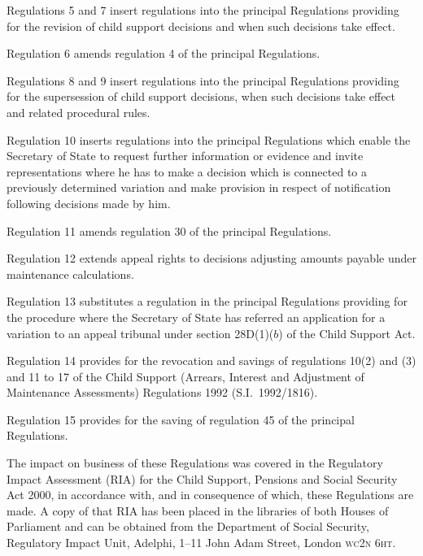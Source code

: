 \documentclass[12pt,a4paper]{article}
\begin{document}
Regulations 5 and 7 insert regulations into the principal Regulations providing for the revision of child support decisions and when such decisions take effect.

Regulation 6 amends regulation 4 of the principal Regulations.

Regulations 8 and 9 insert regulations into the principal Regulations providing for the supersession of child support decisions, when such decisions take effect and related procedural rules.

Regulation 10 inserts regulations into the principal Regulations which enable the Secretary of State to request further information or evidence and invite representations where he has to make a decision which is connected to a previously determined variation and make provision in respect of notification following decisions made by him.

Regulation 11 amends regulation 30 of the principal Regulations.

Regulation 12 extends appeal rights to decisions adjusting amounts payable under maintenance calculations.

Regulation 13 substitutes a regulation in the principal Regulations providing for the procedure where the Secretary of State has referred an application for a variation to an appeal tribunal under section 28D(1)($b$)  of the Child Support Act.

Regulation 14 provides for the revocation and savings of regulations 10(2) and (3) and 11 to 17 of the Child Support (Arrears, Interest and Adjustment of Maintenance Assessments) Regulations 1992 (S.I.\ 1992/1816).

Regulation 15 provides for the saving of regulation 45 of the principal Regulations.

The impact on business of these Regulations was covered in the Regulatory Impact Assessment (RIA) for the Child Support, Pensions and Social Security Act 2000, in accordance with, and in consequence of which, these Regulations are made. A copy of that RIA has been placed in the libraries of both Houses of Parliament and can be obtained from the Department of Social Security, Regulatory Impact Unit, Adelphi, 1--11 John Adam Street, London \textsc{\lowercase{WC2N 6HT}}. 
\end{document}
